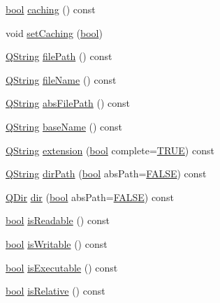\begin{DoxyCompactItemize}
\hyperlink{qglobal_8h_a1062901a7428fdd9c7f180f5e01ea056}{bool} \hyperlink{class_q_file_info_a964c4089a9a867128055209651c01867}{caching} () const 
\item 
void \hyperlink{class_q_file_info_a9f2d5de0b83ff0c42b0004574ec9ddf5}{set\+Caching} (\hyperlink{qglobal_8h_a1062901a7428fdd9c7f180f5e01ea056}{bool})
\item 
\hyperlink{class_q_string}{Q\+String} \hyperlink{class_q_file_info_a33f601c76f569d2a7e412c6737415115}{file\+Path} () const 
\item 
\hyperlink{class_q_string}{Q\+String} \hyperlink{class_q_file_info_aabf62d1b0490784be027aa3de085bec1}{file\+Name} () const 
\item 
\hyperlink{class_q_string}{Q\+String} \hyperlink{class_q_file_info_acfaefbbf6f28d9733d51b699dcf30fc7}{abs\+File\+Path} () const 
\item 
\hyperlink{class_q_string}{Q\+String} \hyperlink{class_q_file_info_ad92985ac2917cca9a05bcff8d78b97b1}{base\+Name} () const 
\item 
\hyperlink{class_q_string}{Q\+String} \hyperlink{class_q_file_info_a2f5d2e6e6a0ddfbb52976de7a97c7a2c}{extension} (\hyperlink{qglobal_8h_a1062901a7428fdd9c7f180f5e01ea056}{bool} complete=\hyperlink{qglobal_8h_a04a6422a52070f0dc478693da640242b}{T\+R\+U\+E}) const 
\item 
\hyperlink{class_q_string}{Q\+String} \hyperlink{class_q_file_info_a57e435be78208b888116a1b7e9408d7e}{dir\+Path} (\hyperlink{qglobal_8h_a1062901a7428fdd9c7f180f5e01ea056}{bool} abs\+Path=\hyperlink{qglobal_8h_a10e004b6916e78ff4ea8379be80b80cc}{F\+A\+L\+S\+E}) const 
\item 
\hyperlink{class_q_dir}{Q\+Dir} \hyperlink{class_q_file_info_ab15cdf011c680004885a5c30cbcbfbf2}{dir} (\hyperlink{qglobal_8h_a1062901a7428fdd9c7f180f5e01ea056}{bool} abs\+Path=\hyperlink{qglobal_8h_a10e004b6916e78ff4ea8379be80b80cc}{F\+A\+L\+S\+E}) const 
\item 
\hyperlink{qglobal_8h_a1062901a7428fdd9c7f180f5e01ea056}{bool} \hyperlink{class_q_file_info_a0982c9e0a0397b2341bad4137dd4b44c}{is\+Readable} () const 
\item 
\hyperlink{qglobal_8h_a1062901a7428fdd9c7f180f5e01ea056}{bool} \hyperlink{class_q_file_info_a1a3d14c1df303bc9174eea52a1dbccd6}{is\+Writable} () const 
\item 
\hyperlink{qglobal_8h_a1062901a7428fdd9c7f180f5e01ea056}{bool} \hyperlink{class_q_file_info_ae43ad39dbb61fa3befc2555282d54717}{is\+Executable} () const 
\item 
\hyperlink{qglobal_8h_a1062901a7428fdd9c7f180f5e01ea056}{bool} \hyperlink{class_q_file_info_a5bb164facc2c9197c74868cfce06c14a}{is\+Relative} () const 

\end{DoxyCompactItemize}
